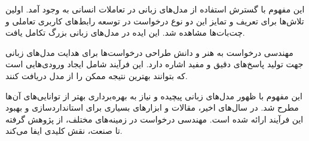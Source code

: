 این مفهوم با گسترش استفاده از مدل‌های زبانی در تعاملات انسانی به وجود آمد. اولین تلاش‌ها برای تعریف و تمایز این دو نوع درخواست در توسعه رابط‌های کاربری تعاملی و چت‌بات‌ها مشاهده شد. این ایده در مدل‌های زبانی بزرگ تکامل یافت.

مهندسی درخواست به هنر و دانش طراحی درخواست‌ها برای هدایت مدل‌های زبانی جهت تولید پاسخ‌های دقیق و مفید اشاره دارد. این فرآیند شامل ایجاد ورودی‌هایی است که بتوانند بهترین نتیجه ممکن را از مدل دریافت کنند.

این مفهوم با ظهور مدل‌های زبانی پیچیده و نیاز به بهره‌برداری بهتر از توانایی‌های آن‌ها مطرح شد. در سال‌های اخیر، مقالات و ابزارهای بسیاری برای استانداردسازی و بهبود این فرآیند ارائه شده است. مهندسی درخواست در زمینه‌های مختلف، از پژوهش گرفته تا صنعت، نقش کلیدی ایفا می‌کند.






























































